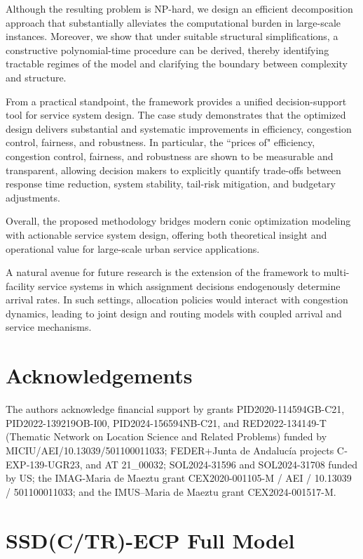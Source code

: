 \documentclass[letter,11pt, reqno]{amsart}
\begin{document}
Although the resulting problem is NP-hard, we design an efficient decomposition approach that substantially alleviates the computational burden in large-scale instances. Moreover, we show that under suitable structural simplifications, a constructive polynomial-time procedure can be derived, thereby identifying tractable regimes of the model and clarifying the boundary between complexity and structure.

From a practical standpoint, the framework provides a unified decision-support tool for service system design. The case study demonstrates that the optimized design delivers substantial and systematic improvements in efficiency, congestion control, fairness, and robustness. In particular, the ``prices of" efficiency, congestion control, fairness, and robustness are shown to be measurable and transparent, allowing decision makers to explicitly quantify trade-offs between response time reduction, system stability, tail-risk mitigation, and budgetary adjustments. 

Overall, the proposed methodology bridges modern conic optimization modeling with actionable service system design, offering both theoretical insight and operational value for large-scale urban service applications.

A natural avenue for future research is the extension of the framework to multi-facility service systems in which assignment decisions endogenously determine arrival rates. In such settings, allocation policies would interact with congestion dynamics, leading to joint design and routing models with coupled arrival and service mechanisms.

 \section*{Acknowledgements}

The authors acknowledge financial support by  grants PID2020-114594GB-C21, 
PID2022-139219OB-I00, PID2024-156594NB-C21, and 
RED2022-134149-T  (Thematic Network on Location Science and Related Problems) funded by MICIU/AEI/10.13039/501100011033; FEDER+Junta de Andalucía projects C‐EXP‐139‐UGR23, and AT 21\_00032; SOL2024-31596
and SOL2024-31708 funded by US;  the IMAG-Maria de Maeztu grant CEX2020-001105-M / AEI / 10.13039 / 501100011033; and the IMUS--Maria de Maeztu grant CEX2024-001517-M. 

\appendix

\section{SSD(C/TR)-ECP Full Model}\label{ap:fullmodel}
\end{document}
